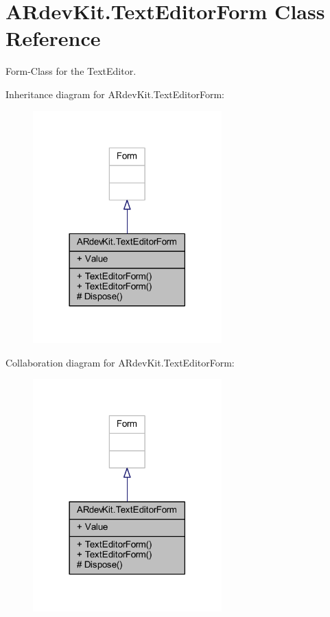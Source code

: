\hypertarget{class_a_rdev_kit_1_1_text_editor_form}{\section{A\-Rdev\-Kit.\-Text\-Editor\-Form Class Reference}
\label{class_a_rdev_kit_1_1_text_editor_form}
}


Form-\/\-Class for the Text\-Editor.  




Inheritance diagram for A\-Rdev\-Kit.\-Text\-Editor\-Form\-:
\nopagebreak
\begin{figure}[H]
\begin{center}
\leavevmode
\includegraphics[width=206pt]{class_a_rdev_kit_1_1_text_editor_form__inherit__graph}
\end{center}
\end{figure}


Collaboration diagram for A\-Rdev\-Kit.\-Text\-Editor\-Form\-:
\nopagebreak
\begin{figure}[H]
\begin{center}
\leavevmode
\includegraphics[width=206pt]{class_a_rdev_kit_1_1_text_editor_form__coll__graph}
\end{center}
\end{figure}
